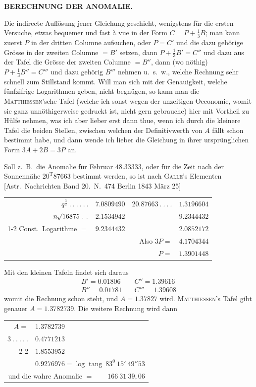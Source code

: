 \clearpage
\thispagestyle{empty}
\noindent{}%
%
\parbox[t]{\dimexpr\linewidth-24mm\relax}{\centering\footnotesize\bfseries BERECHNUNG DER ANOMALIE.\par}%
\makebox[12mm][r]{}\par\nobreak\smallskip
\indent Die indirecte Auflösung jener Gleichung geschieht, wenigstens für die ersten Versuche, etwas bequemer und fast à vue in der Form $C=P+\frac13B$; man kann zuerst $P$ in der dritten Columne aufsuchen, oder $P=C'$ und die dazu gehörige Grösse in der zweiten Columne $=B'$ setzen, dann $P+\frac13B'=C''$ und dazu aus der Tafel die Grösse der zweiten Columne $=B''$, dann (wo nöthig) $P+\frac13B''=C'''$ und dazu gehörig $B'''$ nehmen u.\ s.\ w., welche Rechnung sehr schnell zum Stillstand kommt. Will man sich mit der Genauigkeit, welche fünfzifrige Logarithmen geben, nicht begnügen, so kann man die \textsc{Matthiessen}'sche Tafel (welche ich sonst wegen der unzeitigen Oeconomie, womit sie ganz unnöthigerweise gedruckt ist, nicht gern gebrauche) hier mit Vortheil zu Hülfe nehmen, was ich aber lieber erst dann thue, wenn ich durch die kleinere Tafel die beiden Stellen, zwischen welchen der Definitivwerth von $A$ fällt schon bestimmt habe, und dann wende ich lieber die Gleichung in ihrer ursprünglichen Form $3A+2B=3P$ an.

Soll z.\ B.\ die Anomalie für Februar $48.33333$, oder für die Zeit nach der Sonnennähe $20^{\mathrm T}87663$ bestimmt werden, so ist nach \textsc{Galle}'s Elementen [Astr.\ Nachrichten Band 20.\ N.\ 474 Berlin 1843 März 25]
\begin{center}
{\small\setlength{\tabcolsep}{3pt}
\begin{tabular}{r@{\ }r@{\qquad}r@{\ }r}
$q^{\frac32}\ .\ .\ .\ .\ .\ .$&$7.0809490$&$20.87663\ .\ .\ .\ .$&$1.3196604$\\
$n\mathord{{}^{}\!\surd}16875\ .\ .$&$2.1534942$&&$9.2344432$\\\cline{1-2}\cline{4-4}
Const.\ Logarithme $=$&$9.2344432$&&$2.0852172$\\[3pt]
&&Also $3P=$&$4.1704344$\\
&&$P=$&$1.3901448$
\end{tabular}}
\end{center}
Mit den kleinen Tafeln findet sich daraus
\[
\begin{array}{ll}
B'=0.01806&\quad C''=1.39616\\
B''=0.01781&\quad C'''=1.39608
\end{array}
\]
womit die Rechnung schon steht, und $A=1.37827$ wird. \textsc{Matthiessen}'s Tafel gibt genauer $A=1.3782739$. Die weitere Rechnung wird dann
\begin{center}
\begin{tabular}{r@{\ }l}
$A=$&$1.3782739$\\
$3\ .\ .\ .\ .\ .$&$0.4771213$\\\cline{2-2}
&$1.8553952$\\[3pt]
&$0.9276976=\log\operatorname{tang}\ 83^0\ 15'\ 49''53$\\
\multicolumn{2}{r}{und die wahre Anomalie $=\qquad166\ 31\ 39{,}06$}
\end{tabular}
\end{center}

